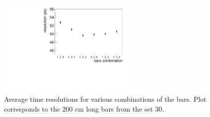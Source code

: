 \begin{figure}[]
\centering
\includegraphics[width=0.6\textwidth]{gleb/fig_gleb_time_resol/avrg_resol_203.pdf}
\caption{Average time resolutions for various combinations of the bars. Plot corresponds to the 200 cm long bars from the set 30. \label{fig:avrgtimeresol}}
\end{figure}
